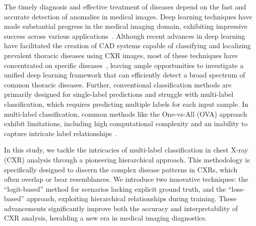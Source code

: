 \documentclass[review,1p,times,numbers]{elsarticle}
\begin{document}
The timely diagnosis and effective treatment of diseases depend on the fast and accurate detection of anomalies in medical images. Deep learning techniques have made substantial progress in the medical imaging domain, exhibiting impressive success across various applications~\cite{litjens_Survey_2017a,eshghali_Machine_2023}.  Although recent advances in deep learning have facilitated the creation of CAD systems capable of classifying and localizing prevalent thoracic diseases using CXR images, most of these techniques have concentrated on specific diseases~\cite{jaiswal_Identifying_2019,lakhani_Deep_2017,pasa_Efficient_2019,ausawalaithong_Automatic_2018}, leaving ample opportunities to investigate a unified deep learning framework that can efficiently detect a broad spectrum of common thoracic diseases. Further, conventional classification methods are primarily designed for single-label predictions and struggle with multi-label classification, which requires predicting multiple labels for each input sample. In multi-label classification, common methods like the One-vs-All (OVA) approach exhibit limitations, including high computational complexity and an inability to capture intricate label relationships~\cite{tsoumakas_MultiLabel_2007}.

In this study, we tackle the intricacies of multi-label classification in chest X-ray (CXR) analysis through a pioneering hierarchical approach. This methodology is specifically designed to discern the complex disease patterns in CXRs, which often overlap or bear resemblances. We introduce two innovative techniques: the ``logit-based'' method for scenarios lacking explicit ground truth, and the ``loss-based'' approach, exploiting hierarchical relationships during training. These advancements significantly improve both the accuracy and interpretability of CXR analysis, heralding a new era in medical imaging diagnostics.
\end{document}
